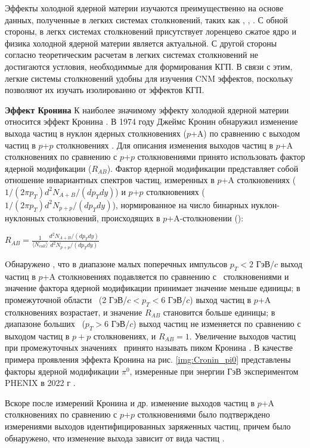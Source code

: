 Эффекты холодной ядерной материи изучаются преимущественно на основе данных, полученные в легких системах столкновений, таких как \pal, \dau, \heau. 
С обной стороны, в легкх системах столкновений присутствует лоренцево сжатое ядро и физика холодной ядерной материи является актуальной. С другой стороны согласно теоретическим расчетам в легких системах столкновений не достигаются устловия, необходиммые для формирования КГП. В связи с этим, легкие системы столкновений удобны для изучения CNM эффектов, поскольку позволяют их изучать изолированно от эффектов КГП. 

\textbf{Эффект Кронина}
К наиболее значимому эффекту холодной ядерной материи относится эффект Кронина \cite{Cronin, Cronin_hadrons_pp_dAu_AuAu, Cronin2}. 
В 1974 году Джеймс Кронин обнаружил изменение выхода частиц в нуклон ядерных столкновениях ($p$+A) по сравнению с выходом частиц в $p$+$p$ столкновениях \cite{Cronin}. 
Для описания изменения выходов частиц в $p$+A столкновениях по сравнению с $p$+$p$ столкновениями принято использовать фактор ядерной модификации ($R_{AB}$). Фактор ядерной модификации представляет собой отношение инвариантных спектров частиц, измеренных в $p$+A столкновениях ($1/(2\pi p_T) d^2N_{A+B}/(dp_T dy)$) и $p$+$p$ столкновениях ($1/(2\pi p_T) d^2N_{p+p}/(dp_T dy)$), нормированное на число бинарных нуклон-нуклонных столкновений, происходящих в $p$+A-столкновении (\Ncoll):

$ R_{AB} = \frac{1}{\langle N_{coll} \rangle} \frac{d^2N_{A+B}/(dp_T dy)}{d^2N_{p+p}/(dp_T dy)}$

Oбнаружено \cite{Cronin, Cronin_hadrons_pp_dAu_AuAu, pi0_smallSysts}, что в диапазоне малых поперечных импульсов $p_T < 2$ ГэВ/$c$ выход частиц в $p$+A столкновениях подавляется по сравнению с \pp \ столкновениями и значение фактора ядерной модификации принимает значение меньше единицы; в промежуточной области \pt \ (2 ГэВ/$c < p_T < 6 $ ГэВ/$c$) выход частиц в $p$+A столкновениях возрастает, и значение $R_{AB}$ становится больше единицы; в диапазоне больших \pt \ ($p_T > 6 $ ГэВ/$c$) выход частиц не изменяется по сравнению с выходом частиц в $p+p$ столкновениях, и $R_{AB}=1$. Увеличение выходов частиц при промежуточных значениях \pt \ принято называть пиком Кронина \cite{pi0_smallSysts}. 
В качестве примера проявления эффекта Кронина на рис. \ref{img:Cronin_pi0} представлены факторы ядерной модификации $\pi^0$, измеренные при энергии  ГэВ экспериментом PHENIX в 2022 г \cite{pi0_smallSysts}. 

Вскоре после измерений Кронина и др. изменение выходов частиц в $p$+A столкновениях по сравнению с $p$+$p$ столкновениями было подтверждено измерениями выходов идентифицированных заряженных частиц, причем было обнаружено, что изменение выхода зависит от вида частиц \cite{Cronin2}. 

